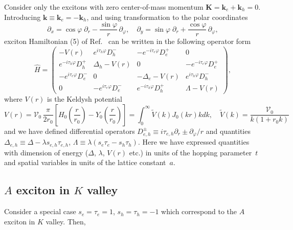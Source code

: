 \documentclass[
aps,
prl,
groupedaddress,
superscriptaddress,
floatfix,
notitlepage
]{revtex4-1}
\def\p{\partial}
\begin{document}
Consider only the excitons with zero center-of-mass momentum $\pmb{K}=\pmb{k}_e+\pmb{k}_h=0$. Introducing $\pmb{k}\equiv \pmb{k}_e = -\pmb{k}_h$,
and using transformation to the polar coordinates
$$
\p_x = \cos\varphi\; \p_r - \frac{\sin\varphi}{r}\,\p_\varphi, \quad
\p_y = \sin\varphi\; \p_r + \frac{\cos\varphi}{r}\,\p_\varphi,
$$
exciton Hamiltonian (5) of Ref.~\cite{Peeters-PRB-2017} can be written in the following operator form
\setlength\arraycolsep{7pt}
\renewcommand*{\arraystretch}{2}
\begin{equation}
\hat{H} =
\begin{pmatrix}
-V(r) &  e^{i\tau_h \varphi}D^-_h & -e^{-i\tau_e \varphi}D^+_e & 0 \\
e^{-i\tau_h\varphi}D^+_h & \Delta_h-V(r) & 0 & -e^{-i\tau_e\varphi}D^+_e \\
-e^{i\tau_e\varphi}D^-_e & 0 & -\Delta_e-V(r) & e^{i\tau_h\varphi}D^-_h \\
0 & -e^{i\tau_e\varphi}D^-_e & e^{-i\tau_h\varphi}D^+_h & \Lambda-V(r)
\end{pmatrix},
\label{H}
\end{equation}
where $V(r)$ is the Keldysh potential 
\begin{equation}
V(r) = \mathcal{V}_0\,\frac{\pi}{2 r_0} \left[ H_0\left(\frac{r}{r_0}\right)-Y_0\left(\frac{r}{r_0}\right) \right]  = \int_0^{\infty}
\tilde{V}(k)J_0(k r) k dk,\quad 
\tilde{V}(k)=\frac{\mathcal{V}_0}{k(1+r_0 k)}
\label{Keldysh}
\end{equation}
and we have defined differential operators
$D^\pm_{e,h} \equiv i\tau_{e,h}\p_r \pm \p_\varphi/r$
and quantities
$\Delta_{e,h} \equiv \Delta -\lambda s_{e,h}\tau_{e,h}$,
$\Lambda \equiv \lambda(s_e \tau_e-s_h\tau_h)$.
Here we have expressed quantities with dimension of energy ($\Delta$, $\lambda$, $V(r)$ etc.) in units of the hopping parameter~$t$ and spatial variables in units of the lattice constant~$a$.

\subsection{$A$ exciton in $K$ valley}

Consider a special case $s_e=\tau_e=1$, $s_h=\tau_h=-1$ which correspond to the $A$ exciton in $K$ valley. Then,
\end{document}
